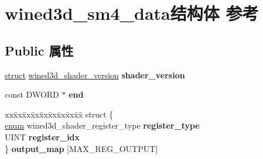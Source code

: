 \hypertarget{structwined3d__sm4__data}{}\section{wined3d\+\_\+sm4\+\_\+data结构体 参考}
\label{structwined3d__sm4__data}
\subsection*{Public 属性}
\begin{DoxyCompactItemize}
\item 
\mbox{\label{structwined3d__sm4__data_aaff4544ebba1a1970059244df19371b0}} 
\hyperlink{interfacestruct}{struct} \hyperlink{structwined3d__shader__version}{wined3d\+\_\+shader\+\_\+version} {\bfseries shader\+\_\+version}
\item 
\mbox{\label{structwined3d__sm4__data_ad05537dc3f8b0b13769ed235e109f564}} 
const D\+W\+O\+RD $\ast$ {\bfseries end}
\item 
\mbox{\label{structwined3d__sm4__data_a6193e8e26a95855a8a8c4abf2490f2ad}} 
\begin{tabbing}
xx\=xx\=xx\=xx\=xx\=xx\=xx\=xx\=xx\=\kill
struct \{\\
\>\hyperlink{interfaceenum}{enum} wined3d\_shader\_register\_type {\bfseries register\_type}\\
\>UINT {\bfseries register\_idx}\\
\} {\bfseries output\_map} \mbox{[}MAX\_REG\_OUTPUT\mbox{]}\\


\end{tabbing}
\end{DoxyCompactItemize}
